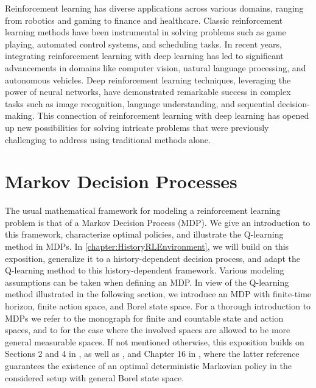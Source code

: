\documentclass[
    a4paper,
    11pt,
    bibliography=totoc,
    listof=totoc,      
    headinclude=true,
    cleardoublepage=empty,
]{scrbook}
\theoremstyle{plain}
\theoremstyle{definition}
\theoremstyle{remark}
\begin{document}
Reinforcement learning has diverse applications across various domains, 
ranging from robotics and gaming to finance and healthcare. Classic 
reinforcement learning methods have been instrumental in solving problems such 
as game playing, automated control systems, and scheduling tasks. In recent 
years, integrating reinforcement learning with deep learning has led to 
significant advancements in domains like computer vision, natural language 
processing, and autonomous vehicles. Deep reinforcement learning techniques, 
leveraging the power of neural networks, have demonstrated remarkable success 
in complex tasks such as image recognition, language understanding, and 
sequential decision-making. This connection of reinforcement learning with 
deep learning has opened up new possibilities for solving intricate problems 
that were previously challenging to address using traditional methods alone.



\section{Markov Decision Processes}
\label{chapter:RLAndMDP:section:MDP}

The usual mathematical framework for modeling a reinforcement learning problem
is that of a Markov Decision Process (MDP). We give an introduction to this
framework, characterize optimal policies, and illustrate the Q-learning method 
in MDPs. In \cref{chapter:HistoryRLEnvironment}, we will build on this 
exposition, generalize it to a history-dependent decision process, and adapt 
the Q-learning method to this history-dependent framework. Various modeling
assumptions can be taken when defining an MDP. In view of the Q-learning
method illustrated in the following section, we introduce an MDP with 
finite-time horizon, finite action space, and Borel state space. For a 
thorough introduction to MDPs we refer to the monograph 
\cite{puterman2005_mdpdsdp} for finite and countable state and action spaces, 
and to \cite{hinderer2016_do} for the case where the involved spaces are 
allowed to be more general measurable spaces. If not mentioned otherwise, this 
exposition builds on Sections 2 and 4 in \cite{puterman2005_mdpdsdp}, as well 
as \cite{szepesvari2010_arl}, and Chapter 16 in \cite{hinderer2016_do}, where 
the latter reference guarantees the existence of an optimal deterministic 
Markovian policy in the considered setup with general Borel state space.
\end{document}
